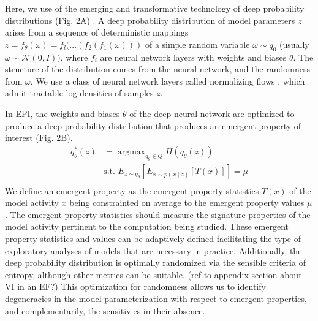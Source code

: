 \documentclass[11pt]{article}
\DeclareMathOperator*{\argmax}{argmax}
\begin{document}
Here, we use of the emerging and transformative technology of deep probability distributions (Fig. 2A) \cite{best_image_DGM, wavenet}.
A deep probability distribution of model parameters $z$ arises from a sequence of deterministic mappings $z = f_\theta(\omega) = f_l(...(f_2(f_1(\omega)))$ of a simple random variable $\omega \sim q_0$ (usually $\omega \sim \mathcal{N}(0, I)$), where $f_i$ are neural network layers  with weights and biases $\theta$.
The structure of the distribution comes from the neural network, and the randomness from $\omega$.
We use a class of neural network layers called normalizing flows \cite{rezende2015variational}, which admit tractable log densities of samples $z$.

In EPI, the weights and biases $\theta$ of the deep neural network are optimized to produce a deep probability distribution that produces an emergent property of interest (Fig. 2B). 
\begin{equation}
\begin{split}
q_\theta^*(z) &= \argmax_{q_\theta \in Q} H(q_\theta(z)) \\
 &  \text{s.t.  } E_{z \sim q_\theta}\left[ E_{x\sim p(x \mid z)}\left[T(x)\right] \right] = \mu \\
 \end{split}
\end{equation}
We define an emergent property as the emergent property statistics $T(x)$ of the model activity $x$ being constrainted on average to the emergent property values $\mu$ .  The emergent property statistics should measure the signature properties of the model activity pertinent to the computation being studied.  These emergent property statistics and values can be adaptively defined facilitating the type of exploratory analyses of models that are necessary in practice.  Additionally, the deep probability distribution is optimally randomized via the sensible criteria of entropy, although other metrics can be suitable. (ref to appendix section about VI in an EF?) This optimization for randomness allows us to identify degeneracies in the model parameterization with respect to emergent properties, and complementarily, the sensitivies in their absence.
\end{document}
